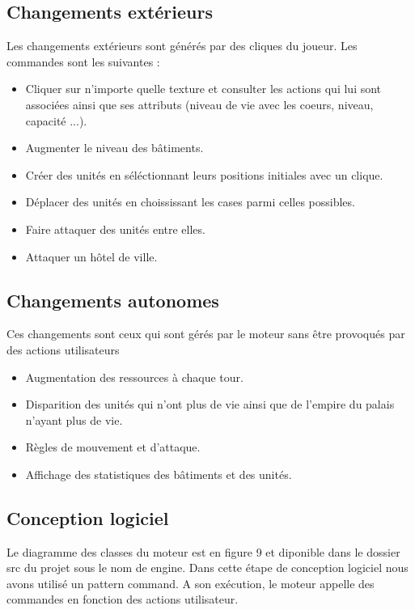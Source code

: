 \documentclass[12pt,a4paper]{article}
\begin{document}
\subsection{Changements extérieurs}
Les changements extérieurs sont générés par des cliques du joueur. Les commandes sont les suivantes : 
\begin{itemize}
\item Cliquer sur n'importe quelle texture et consulter les actions qui lui sont associées ainsi que ses attributs (niveau de vie avec les coeurs, niveau, capacité ...).
\item Augmenter le niveau des bâtiments.
\item Créer des unités en séléctionnant leurs positions initiales avec un clique.
\item Déplacer des unités en choississant les cases parmi celles possibles.
\item Faire attaquer des unités entre elles.
\item Attaquer un hôtel de ville.
\end{itemize}

\subsection{Changements autonomes}
Ces changements sont ceux qui sont gérés par le moteur sans être provoqués par des actions utilisateurs
\begin{itemize}
\item Augmentation des ressources à chaque tour.
\item Disparition des unités qui n'ont plus de vie ainsi que de l'empire du palais n'ayant plus de vie.
\item Règles de mouvement et d'attaque.
\item Affichage des statistiques des bâtiments et des unités.
\end{itemize}


\subsection{Conception logiciel}
Le diagramme des classes du moteur est en figure 9 et diponible dans le dossier src du projet sous le nom de engine.
Dans cette étape de conception logiciel nous avons utilisé un pattern command. A son exécution, le moteur appelle des commandes en fonction des actions utilisateur. \\
\end{document}
